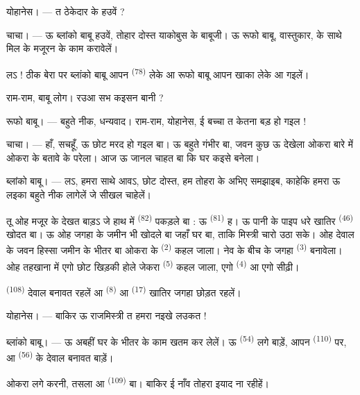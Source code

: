 \textsc{योहानेस}। --- त ठेकेदार के हउवें ?

\textsc{चाचा}। --- ऊ ब्लांको बाबू हउवें, तोहार दोस्त याकोबुस के
बाबूजी। ऊ रूफो बाबू, वास्तुकार, के साथे मिल के मजूरन के काम करावेलें।

लऽ ! ठीक बेरा पर ब्लांको बाबू आपन  \textsuperscript{(78)}
लेके आ रूफो बाबू आपन खाका लेके आ गइलें।

राम-राम, बाबू लोग। रउआ सभ कइसन बानी ?

\textsc{रूफो बाबू}। --- बहुते नीक, धन्यवाद। राम-राम, योहानेस, ई बच्चा
त केतना बड़ हो गइल !

\textsc{चाचा}। --- हाँ, सचहूँ, ऊ छोट मरद हो गइल बा। ऊ बहुते गंभीर बा,
जवन कुछ ऊ देखेला ओकरा बारे में ओकरा के बतावे के परेला। आज ऊ जानल चाहत
बा कि घर कइसे बनेला।

\VUsaut{3.0mm}

\textsc{ब्लांको बाबू}। --- लऽ, हमरा साथे आवऽ, छोट दोस्त, हम तोहरा के
अभिए समझाइब, काहेकि हमरा ऊ लइका बहुते नीक लागेलें जे सीखल चाहेलें।

तू ओह मजूर के देखत बाड़ऽ जे हाथ में  \textsuperscript{(82)}
पकड़ले बा : ऊ  \textsuperscript{(81)} ह। ऊ पानी के
पाइप धरे खातिर  \textsuperscript{(46)} खोदत बा। ऊ ओह जगहा के
जमीन भी खोदले बा जहाँ घर बा, ताकि मिस्त्री चारो  उठा सके।
ओह देवाल के जवन हिस्सा जमीन के भीतर बा ओकरा के 
\textsuperscript{(2)} कहल जाला। नेव के बीच के जगहा 
\textsuperscript{(3)} बनावेला। ओह तहखाना में एगो छोट खिड़की होले जेकरा
 \textsuperscript{(5)} कहल जाला, एगो
 \textsuperscript{(4)} आ एगो सीढ़ी।

 \textsuperscript{(108)} देवाल बनावत रहलें आ
 \textsuperscript{(8)} आ  \textsuperscript{(17)}
खातिर जगहा छोड़त रहलें।

\textsc{योहानेस}। --- बाकिर ऊ राजमिस्त्री त हमरा नइखे लउकत !

\textsc{ब्लांको बाबू}। --- ऊ अबहीं घर के भीतर के काम खतम कर लेलें। ऊ
 \textsuperscript{(54)} लगे बाड़ें, आपन 
\textsuperscript{(110)} पर, आ  \textsuperscript{(56)} के
देवाल बनावत बाड़ें।

ओकरा लगे करनी, तसला आ  \textsuperscript{(109)} बा। बाकिर ई
नाँव तोहरा इयाद ना रहीहें।

